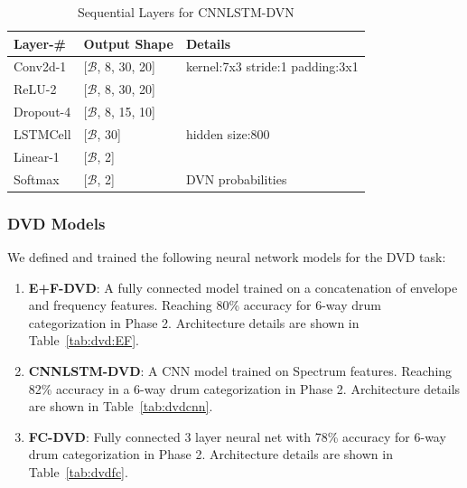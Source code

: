 \documentclass[\main/thesis.tex]{subfiles}
\begin{document}
\begin{center}
\begin{table}[tbp]
\centering
\begin{tabular}{|p{28mm}|p{25mm}|p{50mm}|}
\hline
Layer-\# & Output Shape & Details  \\ \hline
Conv2d-1 & [$\mathcal{B}$, 8, 30, 20]  &
kernel:7x3\newline                  
stride:1\newline    
padding:3x1 \\ \hline
ReLU-2 & [$\mathcal{B}$, 8, 30, 20] & \\  \hline
Dropout-4 & [$\mathcal{B}$, 8, 15, 10] &  \\ \hline
LSTMCell  & [$\mathcal{B}$, 30] & hidden size:800 \\ \hline
Linear-1 & [$\mathcal{B}$, 2] &  \\ \hline 
Softmax & [$\mathcal{B}$, 2] &  DVN probabilities \\ \hline
\end{tabular}

\caption{Sequential Layers for CNNLSTM-DVN }
\label{table:cnndvn}
\end{table}
\end{center}

\subsubsection{DVD Models}
\label{sec:dvd_arch}
We defined and trained the following neural network models for the DVD task:
\begin{enumerate}
\item \textbf{E+F-DVD}: A fully connected model trained on a concatenation of envelope and frequency features. Reaching 80\% accuracy for 6-way drum categorization in Phase 2. Architecture details are shown in Table~\ref{tab:dvd:EF}.
\item \textbf{CNNLSTM-DVD}: A CNN model trained on Spectrum features. Reaching 82\% accuracy in a 6-way drum categorization in Phase 2. Architecture details are shown in Table~\ref{tab:dvdcnn}.
\item \textbf{FC-DVD}: Fully connected 3 layer neural net with 78\% accuracy for 6-way drum categorization in Phase 2. Architecture details are shown in Table~\ref{tab:dvdfc}.
\end{enumerate}
\end{document}
